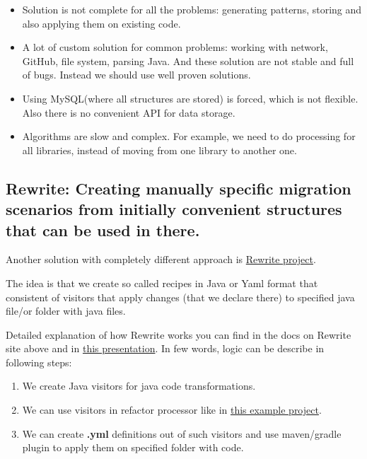 \documentclass[sigplan,screen,11pt]{acmart}
\begin{document}
\begin{itemize}
  \item Solution is not complete for all the problems: generating patterns, storing and also applying them on existing code.
  \item A lot of custom solution for common problems: working with network, GitHub, file system, parsing Java. And these solution are not stable and full of bugs. Instead we should use well proven solutions.
  \item Using MySQL(where all structures are stored) is forced, which is not flexible. Also there is no convenient API for data storage.
  \item Algorithms are slow and complex. For example, we need to do processing for all libraries, instead of moving from one library to another one.
\end{itemize}

\subsection{Rewrite: Creating manually specific migration scenarios from initially convenient structures that can be used in there.}

Another solution with completely different approach is \href{https://docs.openrewrite.org/}{Rewrite project}.

The idea is that we create so called recipes in Java or Yaml format that consistent of visitors that apply changes (that we declare there) to specified java file/or folder with java files.

Detailed explanation of how Rewrite works you can find in the docs on Rewrite site above and in \href{https://docs.google.com/presentation/d/1oJFSzZM37UMEZBLZNngLvk45z-yMvcCjiZojCQzdYx0/edit#slide=id.p}{this presentation}.
In few words, logic can be describe in following steps:

\begin{enumerate}
    \item We create Java visitors for java code transformations.
    \item We can use visitors in refactor processor like in \href{https://docs.google.com/presentation/d/1oJFSzZM37UMEZBLZNngLvk45z-yMvcCjiZojCQzdYx0/edit#slide=id.p}{this example project}.
    \item We can create \textbf{.yml} definitions out of such visitors and use maven/gradle plugin to apply them on specified folder with code.
\end{enumerate}
\end{document}
